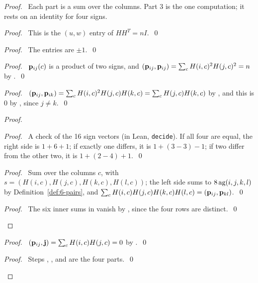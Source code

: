 \begin{proof}
 \pfsketch\ Each part is a sum over the columns. Part 3 is the one computation; it rests on an
 identity for four signs.
 \begin{proof}\pf\ This is the $(u,w)$ entry of $HH^T=nI$.~\qed\end{proof}
 \begin{proof}\pf\ The entries are $\pm1$.~\qed\end{proof}
 \begin{proof}\pf\ ${\mathbf p}_{ij}(c)$ is a product of two signs, and
  $({\mathbf p}_{ij},{\mathbf p}_{ij})=\sum_cH(i,c)^2H(j,c)^2=n$ by .~\qed\end{proof}
 \begin{proof}\pf\ $({\mathbf p}_{ij},{\mathbf p}_{ik})=\sum_cH(i,c)^2H(j,c)H(k,c)=\sum_cH(j,c)H(k,c)$ by
  , and this is 0 by , since $j\neq k$.~\qed\end{proof}
 \begin{proof}
  \begin{proof}\pf\ A check of the 16 sign vectors (in Lean, \texttt{decide}). If all four
   are equal, the right side is $1+6+1$; if exactly one differs, it is $1+(3-3)-1$; if two
   differ from the other two, it is $1+(2-4)+1$.~\qed\end{proof}
  \begin{proof}\pf\ Sum  over the columns $c$, with
   $s=(H(i,c),H(j,c),H(k,c),H(l,c))$; the left side sums to $8\mathop{\mathrm{ag}}\nolimits(i,j,k,l)$ by
   Definition~\ref{def:6-pairs}, and $\sum_cH(i,c)H(j,c)H(k,c)H(l,c)=({\mathbf p}_{ij},{\mathbf p}_{kl})$.~\qed
  \end{proof}
  \qedstep
  \begin{proof}\pf\ The six inner sums in  vanish by , since
   the four rows are distinct.~\qed\end{proof}
 \end{proof}
 \begin{proof}\pf\ $({\mathbf p}_{ij},{\mathbf j})=\sum_cH(i,c)H(j,c)=0$ by .~\qed\end{proof}
 \qedstep
 \begin{proof}\pf\ Steps , ,  and
   are the four parts.~\qed\end{proof}
\end{proof}

